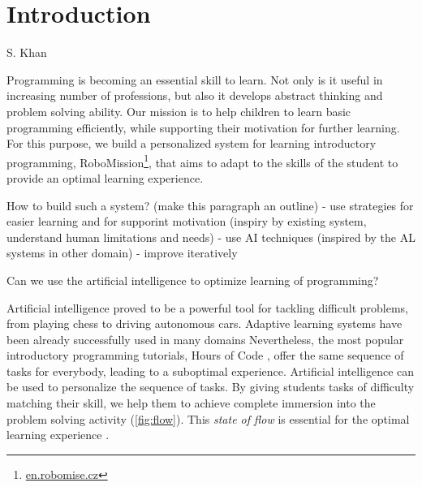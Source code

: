 \chapter{Introduction}
\label{chap:introduction}


{S. Khan}

Programming is becoming an essential skill to learn.
Not only is it useful in increasing number of professions,
but also it develops abstract thinking and problem solving ability. %
Our mission is to help children to learn basic programming efficiently,
while supporting their motivation for further learning.
For this purpose, we build a personalized system for learning introductory
programming, RoboMission\footnote{\url{en.robomise.cz}},
that aims to adapt to the skills of the student
to provide an optimal learning experience.

How to build such a system? (make this paragraph an outline)
- use strategies for easier learning and for supporint motivation
  (inspiry by existing system, understand human limitations and needs)
- use AI techniques (inspired by the AL systems in other domain)
- improve iteratively

Can we use the artificial intelligence to optimize learning of programming?

Artificial intelligence proved to be a powerful tool for tackling difficult problems,
from playing chess to driving autonomous cars. %
Adaptive learning systems have been already successfully used in many domains
\cite{mathsgarden, alg.evaluation-geography, matmat.response-times}
Nevertheless, the most popular introductory programming tutorials,
Hours of Code \cite{hour-of-code},
offer the same sequence of tasks for everybody,
leading to a suboptimal experience.
Artificial intelligence can be used to personalize the sequence of tasks.
By giving students tasks of difficulty matching their skill,
we help them to achieve complete immersion into the problem solving
activity (\cref{fig:flow}).
This \emph{state of flow} \cite{flow}
is essential for the optimal learning experience
\cite{adaptive-practice}.



